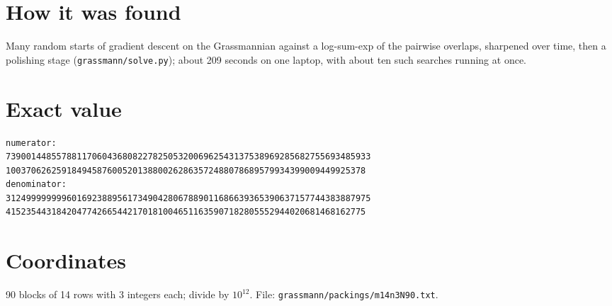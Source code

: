 \documentclass[11pt,a4paper]{article}
\begin{document}
\section{How it was found}
Many random starts of gradient descent on the Grassmannian against a log-sum-exp of the pairwise overlaps, sharpened over time, then a polishing stage (\texttt{grassmann/solve.py}); about 209 seconds on one laptop, with about ten such searches running at once.


\appendix
\section{Exact value}
{\small
\begin{verbatim}
numerator:
739001448557881170604368082278250532006962543137538969285682755693485933
10037062625918494587600520138800262863572488078689579934399009449925378
denominator:
312499999999601692388956173490428067889011686639365390637157744383887975
41523544318420477426654421701810046511635907182805552944020681468162775
\end{verbatim}}

\section{Coordinates}
90 blocks of 14 rows with 3 integers each; divide by $10^{12}$. File: \texttt{grassmann/packings/m14n3N90.txt}.
{\tiny
\begin{multicols}{3}
\end{multicols}}
\end{document}
